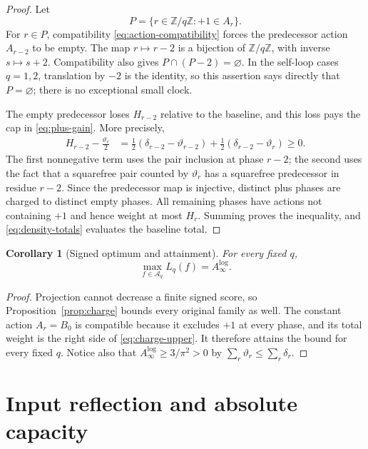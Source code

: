 \documentclass[11pt]{article}
\newtheorem{corollary}[theorem]{Corollary}
\theoremstyle{definition}
\theoremstyle{remark}
\newcommand{\dd}{\delta}
\newcommand{\thh}{\vartheta}
\newcommand{\Alog}{A_{\infty}^{\log}}
\newcommand{\Zq}{\mathbb Z/q\mathbb Z}
\begin{document}
\begin{proof}
Let
\[
 P=\{r\in\Zq:+1\in A_r\}.
\]
For $r\in P$, compatibility \eqref{eq:action-compatibility} forces the
predecessor action $A_{r-2}$ to be empty.  The map
$r\mapsto r-2$ is a bijection of $\Zq$, with inverse $s\mapsto s+2$.
Compatibility also gives $P\cap(P-2)=\varnothing$.  In the self-loop cases
$q=1,2$, translation by $-2$ is the identity, so this assertion says
directly that $P=\varnothing$; there is no exceptional small clock.

The empty predecessor loses $H_{r-2}$ relative to the baseline, and this
loss pays the cap in \eqref{eq:plus-gain}.  More precisely,
\begin{align}
 H_{r-2}-\frac{\thh_r}{2}
 &=\frac12(\dd_{r-2}-\thh_{r-2})
   +\frac12(\dd_{r-2}-\thh_r)\ge0.
 \label{eq:charge-identity}
\end{align}
The first nonnegative term uses the pair inclusion at phase $r-2$; the
second uses the fact that a squarefree pair counted by $\thh_r$ has a
squarefree predecessor in residue $r-2$.  Since the predecessor map is
injective, distinct plus phases are charged to distinct empty phases.  All
remaining phases have actions not containing $+1$ and hence weight at most
$H_r$.  Summing proves the inequality, and \eqref{eq:density-totals}
evaluates the baseline total.
\end{proof}

\begin{corollary}[Signed optimum and attainment]
\label{cor:signed}
For every fixed $q$,
\begin{equation}
 \max_{f\in\mathcal A_q}L_q(f)=\Alog.
 \label{eq:signed-optimum}
\end{equation}
\end{corollary}

\begin{proof}
Projection cannot decrease a finite signed score, so
Proposition~\ref{prop:charge} bounds every original family as well.  The
constant action $A_r=B_0$ is compatible because it excludes $+1$ at every
phase, and its total weight is the right side of
\eqref{eq:charge-upper}.  It therefore attains the bound for every fixed
$q$.  Notice also that $\Alog\ge3/\pi^2>0$ by
$\sum_r\thh_r\le\sum_r\dd_r$.
\end{proof}

\section{Input reflection and absolute capacity}
\end{document}
